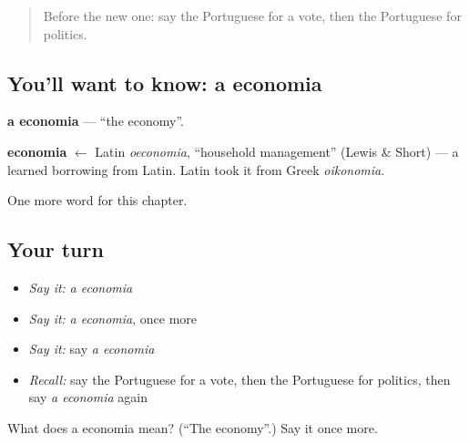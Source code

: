 \label{lesson:PT-C189-economia}



\begin{quote}
Before the new one: say the Portuguese for a vote, then the Portuguese for politics.
\end{quote}

\subsection*{You'll want to know: a economia}
\textbf{a economia} — \textquotedblleft{}the economy\textquotedblright{}.

\begin{cousinweb}
\textbf{economia} $\leftarrow$ Latin \emph{oeconomia}, \textquotedblleft{}household management\textquotedblright{} (Lewis \& Short) — a learned borrowing from Latin. Latin took it from Greek \emph{oikonomia}.
\end{cousinweb}

\begin{grammarlens}[title={What you've built}]
One more word for this chapter.
\end{grammarlens}

\subsection*{Your turn}
\begin{itemize}
\raggedright
  \item \emph{Say it:} \emph{a economia}
  \item \emph{Say it:} \emph{a economia}, once more
  \item \emph{Say it:} say \emph{a economia}
  \item \emph{Recall:} say the Portuguese for a vote, then the Portuguese for politics, then say \emph{a economia} again
\end{itemize}

\begin{tcolorbox}[breakable,colback=teal!4,colframe=teal!35!black,title={Before you move on}]
What does a economia mean? (\textquotedblleft{}The economy\textquotedblright{}.) Say it once more.
\end{tcolorbox}
